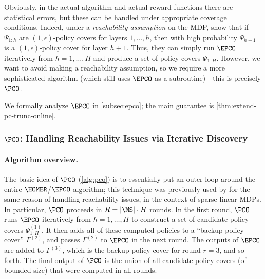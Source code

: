 Obviously, in the actual algorithm and actual reward functions there are statistical errors, but these can be handled under appropriate coverage conditions. Indeed, under a \emph{reachability assumption} on the MDP, \cite{misra2020kinematic} show that if $\Psi_{1:h}$ are $(1,\epsilon)$-policy covers for layers $1,\dots,h$, then with high probability $\Psi_{h+1}$ is a $(1,\epsilon)$-policy cover for layer $h+1$. Thus, they can simply run $\EPCO$ iteratively from $h=1,\dots,H$ and produce a set of policy covers $\Psi_{1:H}$. However, we want to avoid making a reachability assumption, so we require a more sophisticated algorithm (which still uses $\EPCO$ as a subroutine)---this is precisely $\PCO$.

We formally analyze $\EPCO$ in \cref{subsec:epco}; the main guarantee is \cref{thm:extend-pc-trunc-online}.

\subsubsection{$\PCO$: Handling Reachability Issues via Iterative Discovery}

\paragraph{Algorithm overview.} The basic idea of $\PCO$ (\cref{alg:pco}) is to essentially put an outer loop around the entire $\HOMER$/$\EPCO$ algorithm; this technique was previously used by \cite{golowich2024exploring} for the same reason of handling reachability issues, in the context of sparse linear MDPs. In particular, $\PCO$ proceeds in $R= |\MS| \cdot H$ rounds. In the first round, $\PCO$ runs $\EPCO$ iteratively from $h=1,\dots,H$ to construct a set of candidate policy covers $\Psi_{1:H}^{(1)}$. It then adds all of these computed policies to a ``backup policy cover'' $\Gamma^{(2)}$, and passes $\Gamma^{(2)}$ to $\EPCO$ in the next round. The outputs of $\EPCO$ are added to $\Gamma^{(3)}$, which is the backup policy cover for round $r=3$, and so forth. The final output of $\PCO$ is the union of all candidate policy covers (of bounded size) that were computed in all rounds. 

